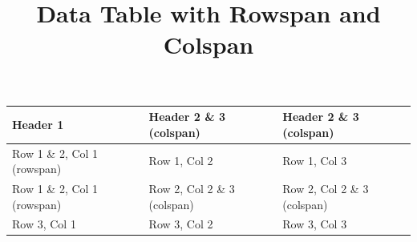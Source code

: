 \documentclass[11pt,a4paper]{article}
\title{Data Table with Rowspan and Colspan}
\begin{document}
\maketitle

\begin{table}[h]
\begin{tabular}{|l|l|l|}
\hline
Header 1 & Header 2 \& 3 (colspan) & Header 2 \& 3 (colspan) \\ \hline
Row 1 \& 2, Col 1 (rowspan) & Row 1, Col 2 & Row 1, Col 3 \\ \hline
Row 1 \& 2, Col 1 (rowspan) & Row 2, Col 2 \& 3 (colspan) & Row 2, Col 2 \& 3 (colspan) \\ \hline
Row 3, Col 1 & Row 3, Col 2 & Row 3, Col 3 \\ \hline
\end{tabular}
\end{table}
\end{document}

